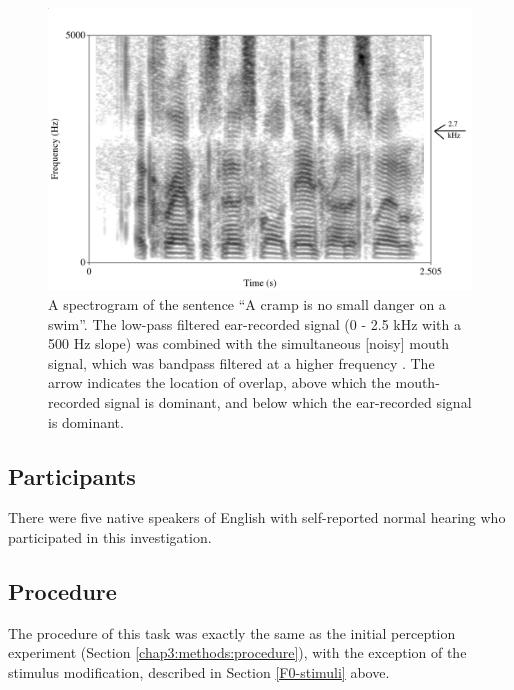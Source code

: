 \begin{figure}[h]
\centering
  \includegraphics[width=\textwidth]{figure/combined-signal_labeled.png}
  \caption{A spectrogram of the sentence ``A cramp is no small danger on a swim''.  The low-pass filtered ear-recorded signal (0 - 2.5 kHz with a 500 Hz slope) was combined with the simultaneous [noisy] mouth signal, which was bandpass filtered at a higher frequency \DIFaddbeginFL {}\DIFaddendFL .  The arrow indicates the location of overlap, above which the mouth-recorded signal is dominant, and below which the ear-recorded signal is dominant.}
  \label{fig:combined-signal}
\end{figure}
%

\subsection{Participants}
There were five native speakers of English with self-reported normal hearing who participated in this investigation.  

\subsection{Procedure}
The procedure of this task was exactly the same as the initial perception experiment (Section \ref{chap3:methods:procedure}), with the exception of the stimulus modification, described in Section \ref{F0-stimuli} above.



